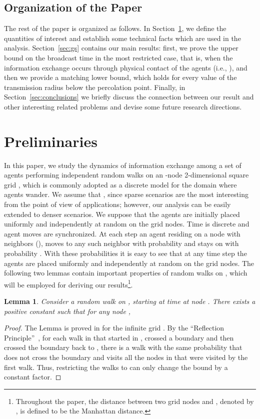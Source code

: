 \documentclass[11pt]{article}
\newtheorem{lemm}{Lemma}
\begin{document}
\subsection{Organization of the Paper}
The rest of the paper is organized as follows.  In
Section~\ref{sec:prelim}, we define the quantities of interest and
establish some technical facts which are used in the analysis.
Section~\ref{sec:gs} contains our main results: first, we prove the
upper bound on the broadcast time in the most restricted case, that
is, when the information exchange occurs through physical contact of
the agents (i.e., ), and then we provide a matching lower bound,
which holds for every value of the transmission radius  below the
percolation point.  Finally, in Section~\ref{sec:conclusions} we
briefly discuss the connection between our result and other
interesting related problems and devise some future research directions.


\section{Preliminaries}
\label{sec:prelim}
In this paper, we study the dynamics of information exchange among a
set  of  agents performing independent random walks on an
-node 2-dimensional square grid ,
which is commonly adopted as a discrete model
for the domain where agents wander.
We assume that ,
since sparse scenarios are the most interesting
from the point of view of applications;
however, our analysis can be easily extended to denser scenarios.
We suppose that the agents
are initially placed uniformly and independently at random on the grid
nodes. Time is discrete and agent moves are synchronized.  At each
step an agent residing on a node  with  neighbors (), moves to any such neighbor with probability  and
stays on  with probability . With these probabilities it
is easy to see that at any time step the agents are placed
uniformly and independently at random on the grid nodes.
The following two lemmas contain important properties
of random walks on , which will be employed for deriving our 
results\footnote{Throughout the paper, the distance between two
grid nodes  and , denoted by , is defined to be the
Manhattan distance.}. 
\begin{lemm}
\label{lemm:SRW}
Consider a random walk on , starting at time  at node .
There exists a positive constant  such that
for any node ,

\end{lemm}
\begin{proof}
The Lemma is proved in \cite[Theorem~2.2]{AlvesMP02} for the infinite
grid .  By the ``Reflection Principle''~\cite[Page 72]{Feller68},
for each walk in  that started in
, crossed a boundary and then crossed the boundary back to ,
there is a walk with the same probability that does not cross the
boundary and visits all the nodes in  that were visited by the
first walk.  Thus, restricting the walks to  can only change the
bound by a constant factor.
\end{proof}
\end{document}

